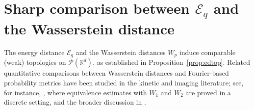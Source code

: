 \documentclass[12pt,a4paper,oneside]{amsart}
\theoremstyle{plain}
\theoremstyle{definition}
\numberwithin{equation}{section}
\numberwithin{figure}{section}
\numberwithin{table}{section}
\theoremstyle{remark}
\newcommand{\R}{\mathbb{R}}
\newcommand{\dd}{\textup{d}}
\newcommand{\expAhlfors}{\beta}
\begin{document}




% 
\section{Sharp comparison between \texorpdfstring{$\mathcal{E}_q$}{Eq} 
and the Wasserstein distance}\label{sec:W1}
The energy distance $\mathcal{E}_q$ and the Wasserstein distances $W_p$ 
induce comparable (weak) topologies on $\mathcal{P}(\R^d)$, as established in 
Proposition~\ref{prop:edtop}.  Related quantitative comparisons between 
Wasserstein distances and Fourier-based probability metrics have been studied in 
the kinetic and imaging literature; see, for instance, 
\cite{Auricchio2020}, where equivalence estimates 
with $W_1$ and $W_2$ are proved in a discrete setting, and the broader discussion 
in \cite{auricchio2026kinetic}.
\end{document}
